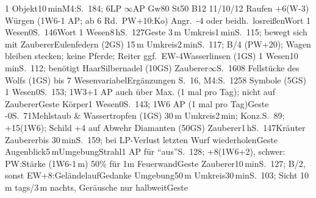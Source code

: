 \documentclass{m5figur-mv}[2018/06/10]
\begin{document}
{{} %

%
  {1 Objekt}{10\,min}{M4:S.~184; 6LP $\infty$AP Gw80 St50 B12 11/10/12
  Raufen +6(W-3) Würgen (1W6-1 AP; ab 6 Rd.\ PW+10:Ko)
  Angr.\ -4 oder beidh.\ losreißen}{Wort}
%
  {1 Wesen}{0}{S.~146}{Wort}
%
  {1 Wesen}{8\,h}{S.~127}{Geste}
%
  {3\,m Umkreis}{1\,min}{S.~115; bewegt sich mit Zauberer}{Eulenfedern (2GS)}
%
  {15\,m Umkreis}{2\,min}{S.~117; B/4 (PW+20); Wagen bleiben stecken;
  keine Pferde; Reiter ggf.\ EW-4}{Wasserlinsen (1GS)}
%
  {1 Wesen}{10\,min}{S.~112; benötigt Haar}{Silbernadel (10GS)}
%
  {Zauberer}{$\infty$}{S.~160}{8 Fellstücke des Wolfs (1GS)}
%
  {bis 7 Wesen}{variabel}{Ergänzungen S.~16, M4:S.~125}{8 Symbole (5GS)}
%
  {1 Wesen}{0}{S.~153; 1W3+1 AP auch über Max. (1 mal pro Tag);
  nicht auf Zauberer}{Geste}
%
  {Körper}{1 Wesen}{0}{S.~143; 1W6 AP (1 mal pro Tag)}{Geste}
%
  {-}{0}{S.~71}{Mehlstaub \& Wassertropfen (1GS)}
%
  {30\,m Umkreis}{2\,min; Konz.}{S.~89; +15(1W6); Schild +4 auf Abwehr}%
  {Diamanten (50GS)}
%
  {Zauberer}{1\,h}{S.~147}{Kräuter}
%
  {Zauberer}{bis 30\,min}{S.~159;
  bei LP-Verlust letzten Wurf wiederholen}{Geste}
%
  {Augenblick}{5\,m}{Umgebung}{Strahl}{1 AP für "`aus"'}{S.~128;
  +8(1W6+2), schwer: PW:Stärke (1W6-1\,m) 50\% für 1m Feuerwand}{Geste}
%
  {Zauberer}{10\,min}{S.~127; B/2, sonst EW+8:Geländelauf}{Gedanke}
%
  {Umgebung}{50\,m Umkreis}{30\,min}{S.~103; Sicht 10\,m tags/3\,m nachts,
  Geräusche nur halbweit}{Geste}

}
\end{document}
